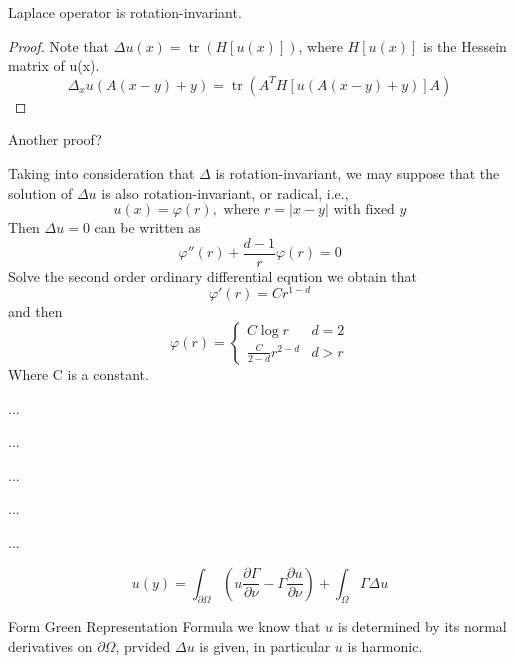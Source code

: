\documentclass{simplenotes}
\DeclareMathOperator{\Tr}{tr}
\renewcommand{\phi}{\varphi}
\begin{document}
\begin{lemma}
Laplace operator is rotation-invariant.
\begin{proof}
Note that $\Delta u(x) = \Tr(H[u(x)])$, where $H[u(x)]$ is the Hessein matrix of u(x).
\[\Delta_x u(A(x-y)+y)=\Tr(A^T H[u(A(x-y)+y)] A)\]
\end{proof}
Another proof?
\end{lemma}

Taking into consideration that $\Delta$ is rotation-invariant, we may suppose that the solution of $\Delta u$ is also rotation-invariant, or radical, i.e.,
\[u(x) = \phi(r), \text{ where } r=|x-y| \text{ with fixed } y\]
Then $\Delta u =0$ can be written as 
\[\phi '' (r) +\frac{d-1}{r} \phi(r) =0\]
Solve the second order ordinary differential eqution we obtain that 
\[\phi'(r) =Cr^{1-d}\]
and then
\[\phi(r) =\begin{cases}
C\log r & d=2\\
\frac{C}{2-d}r^{2-d} &d>r
\end{cases}
\]
Where C is a constant.

\begin{definition}
...
\end{definition}

\begin{lemma}
...
\end{lemma}


\begin{lemma}
...
\end{lemma}

\begin{lemma}
...
\end{lemma}

\begin{lemma}
...
\end{lemma}

\begin{theorem}
\[u(y) = \int_{\partial \Omega} \left( u \frac{\partial \Gamma}{\partial\nu}- \Gamma\frac{\partial u}{\partial\nu} \right )+\int_\Omega \Gamma \Delta u\]
\end{theorem}

\begin{remark}
Form Green Representation Formula we know that $u$ is determined by its normal derivatives on $\partial\Omega$, prvided $\Delta u$ is given, in particular $u$ is harmonic.
\end{remark}
\end{document}
